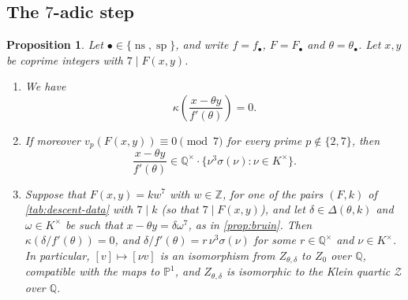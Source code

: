 \documentclass[12pt]{amsart}
\renewcommand{\P}{\mathbb{P}}
\newcommand{\Q}{\mathbb{Q}}
\newcommand{\Z}{\mathbb{Z}}
\newcommand{\Pone}{\P^{1}}
\newcommand{\calZ}{{\mathcal Z}}
\DeclareMathOperator{\ns}{ns}
\DeclareMathOperator{\spc}{sp}
\numberwithin{equation}{section}
\newtheorem{proposition}[theorem]{Proposition}
\theoremstyle{definition}
\begin{document}
\subsection{The \texorpdfstring{$7$}{7}-adic step}
\label{ss:7-adic}
\begin{proposition}
  \label{prop:seven-adic}
  Let $\bullet \in \{\ns,\spc\}$, and write $f = f_{\bullet}$,
  $F = F_{\bullet}$ and $\theta = \theta_{\bullet}$. Let $x,y$ be coprime integers with
  $7 \mid F(x,y)$.
  \begin{enumerate}
  \item \label{item:kappa-zero} We have
    \[
      \kappa\left(\frac{x - \theta y}{f'(\theta)}\right) = 0 .
    \]
  \item \label{item:in-image} If moreover $v_p(F(x,y)) \equiv 0 \pmod 7$ for
    every prime $p \notin \{2,7\}$, then
    \[
      \frac{x - \theta y}{f'(\theta)} \in \Q^{\times}\cdot\bigl\{\nu^{3}\sigma(\nu) : \nu \in K^{\times}\bigr\}.
    \]
  \item \label{item:Z-is-Klein} Suppose that $F(x,y) = kw^{7}$ with $w \in \Z$,
    for one of the pairs $(F,k)$ of \cref{tab:descent-data} with $7 \mid k$ (so
    that $7 \mid F(x,y)$), and
    let $\delta \in \Delta(\theta,k)$ and $\omega \in K^{\times}$ be such that
    $x - \theta y = \delta\omega^{7}$, as in \cref{prop:bruin}. Then
    $\kappa(\delta/f'(\theta)) = 0$, and $\delta/f'(\theta) =
    r\,\nu^{3}\sigma(\nu)$ for some $r \in \Q^{\times}$ and $\nu \in
    K^{\times}$. In particular, $[v] \mapsto [\nu v]$ is an isomorphism from
    $Z_{\theta,\delta}$ to $Z_0$ over $\Q$, compatible with the maps to $\Pone$,
    and $Z_{\theta,\delta}$ is isomorphic to the Klein quartic $\calZ$ over
    $\Q$.
  \end{enumerate}
\end{proposition}
\end{document}
